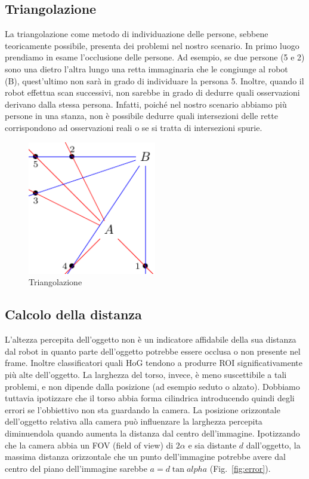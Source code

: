 \documentclass[a4paper]{article}
\begin{document}
	\subsection{Triangolazione}\label{subsec:Triangolazione}
	La triangolazione come metodo di individuazione delle persone, sebbene teoricamente possibile, presenta dei problemi nel nostro scenario. In primo luogo prendiamo in esame l'occlusione delle persone. Ad esempio, se due persone (5 e 2) sono una dietro l'altra lungo una retta immaginaria che le congiunge al robot (B), quest'ultimo non sarà in grado di individuare la persona 5. Inoltre, quando il robot effettua scan successivi, non sarebbe in grado di dedurre quali osservazioni derivano dalla stessa persona. Infatti, poiché nel nostro scenario abbiamo più persone in una stanza, non è possibile dedurre quali intersezioni delle rette corrispondono ad osservazioni reali o se si tratta di intersezioni spurie. 
	
	\begin{figure}[H]
		\centering
		\includegraphics[width=0.5\textwidth]{./img/ideal_object_triangulation.pdf}
		\caption{Triangolazione}
		\label{fig:triangulation}
	\end{figure}
	
	\subsection{Calcolo della distanza}\label{subsec:Calcolo-della-distanza}
	
	L'altezza percepita dell'oggetto non è un indicatore affidabile della sua distanza dal robot in quanto parte dell'oggetto potrebbe essere occlusa o non presente nel frame. Inoltre classificatori quali HoG tendono a produrre ROI significativamente più alte dell'oggetto. La larghezza del torso, invece, è meno suscettibile a tali problemi, e non dipende dalla posizione (ad esempio seduto o alzato). Dobbiamo tuttavia ipotizzare che il torso abbia forma cilindrica introducendo quindi degli errori se l'obbiettivo non sta guardando la camera.	La posizione orizzontale dell'oggetto relativa alla camera può influenzare la larghezza percepita diminuendola quando aumenta la distanza dal centro dell'immagine. Ipotizzando che la camera abbia un FOV (field of view) di $2\alpha$ e sia distante $d$ dall'oggetto, la massima distanza orizzontale che un punto dell'immagine potrebbe avere dal centro del piano dell'immagine sarebbe $a = d \tan alpha$ (Fig.~\ref{fig:error}).
	
\end{document}

